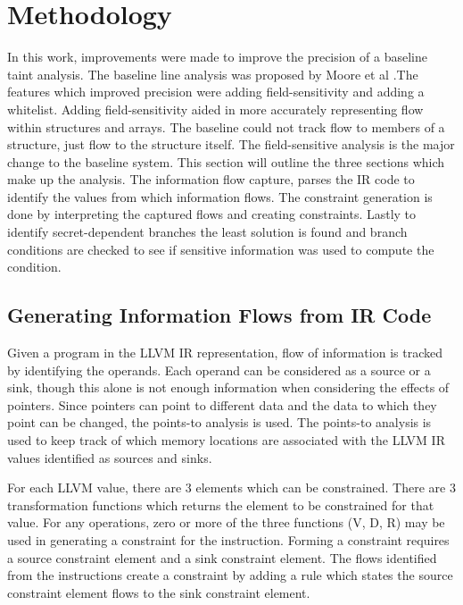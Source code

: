 \chapter{Methodology}
In this work, improvements were made to improve the precision of a baseline
taint analysis. The baseline line analysis was proposed by Moore et al
\cite{moore2011static}.The features which improved precision were adding
field-sensitivity and adding a whitelist. Adding field-sensitivity aided in more
accurately representing flow within structures and arrays. The baseline could
not track flow to members of a structure, just flow to the structure itself. The
field-sensitive analysis is the major change to the baseline system. This
section will outline the three sections which make up the analysis. The
information flow capture, parses the IR code to identify the values from which
information flows. The constraint generation is done by interpreting the
captured flows and creating constraints. Lastly to identify secret-dependent
branches the least solution is found and branch conditions are checked to see if
sensitive information was used to compute the condition.

\section{Generating Information Flows from IR Code}

   Given a program in the LLVM IR representation, flow of information is tracked
   by identifying the operands. Each operand can be considered as a source or a
   sink, though this alone is not enough information when considering the
   effects of pointers. Since pointers can point to different data and the data
   to which they point can be changed, the points-to analysis is used. The
   points-to analysis is used to keep track of which memory locations are
   associated with the LLVM IR values identified as sources and sinks.

   For each LLVM value, there are 3 elements which can be constrained. There are
   3 transformation functions which returns the element to be constrained for
   that value. For any operations, zero or more of the three functions (V, D, R)
   may be used in generating a constraint for the instruction. Forming a
   constraint requires a source constraint element and a sink constraint
   element. The flows identified from the instructions create a constraint by
   adding a rule which states the source constraint element flows to the sink
   constraint element.

